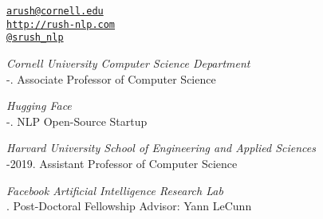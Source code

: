 \documentclass[10pt]{article}
\makeatletter
\def\myemail{arush@cornell.edu}
\def\myweb{http://rush-nlp.com}
\def\myphone{(215) 317-8089}
\def\myfax{srush\_nlp}
\makeatother
\begin{document}
\begin{minipage}[t]{2.95in}

\end{minipage}
\hfill
\hfill
\begin{minipage}[t]{1.7in}
	\flushright %
	{\scriptsize  \texttt{\href{mailto:\myemail}{\myemail}}} \\
	{\scriptsize  \texttt{\href{\myweb}{\myweb}}} \\
	{\scriptsize  \texttt{\href{http://twitter.com/\myfax}{@\myfax}}} \\
\end{minipage}


\medskip

\reversemarginpar
\medskip


\noindent\emph{Cornell University Computer Science Department \vspace{0.01in}}\\
-.  Associate Professor of Computer Science

\medskip
\noindent\emph{Hugging Face \vspace{0.01in}}\\
-.  NLP Open-Source Startup

\medskip
\noindent\emph{Harvard University School of Engineering and Applied Sciences \vspace{0.01in}}\\
-2019.  Assistant Professor of Computer Science

\medskip
\noindent\emph{Facebook Artificial Intelligence Research Lab \vspace{0.01in}}\\
.  Post-Doctoral Fellowship Advisor: Yann LeCunn

\bigskip

\end{document}
